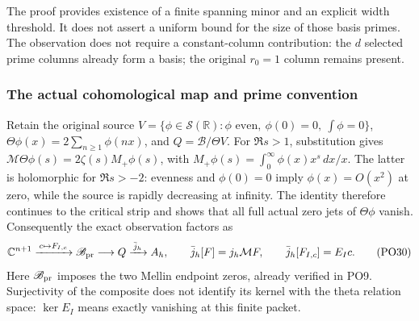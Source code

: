 \documentclass[11pt,a4paper]{article}
\theoremstyle{definition}\newtheorem{definition}[theorem]{Definition}
\newcommand{\C}{\mathbb C}\newcommand{\R}{\mathbb R}
\begin{document}
The proof provides existence of a finite spanning minor and an
explicit width threshold. It does not assert a uniform bound for
the size of those basis primes. The observation does not require
a constant-column contribution: the \(d\) selected prime columns
already form a basis; the original \(r_0=1\) column remains present.

\subsubsection{The actual cohomological map and prime convention}

Retain the original source
\(V=\{\phi\in\mathcal S(\R):\phi\text{ even},
\ \phi(0)=0,\ \int\phi=0\}\),
\(\Theta\phi(x)=2\sum_{n\ge1}\phi(nx)\), and \(Q=\mathscr B/\Theta V\).
For \(\Re s>1\), substitution gives
\(\mathcal M\Theta\phi(s)=2\zeta(s)M_+\phi(s)\), with
\(M_+\phi(s)=\int_0^\infty\phi(x)x^s\,dx/x\).
The latter is holomorphic for \(\Re s>-2\):
evenness and \(\phi(0)=0\) imply \(\phi(x)=O(x^2)\) at zero,
while the source is rapidly decreasing at infinity.
The identity therefore continues to the critical strip and
shows that all full actual zero jets of \(\Theta\phi\) vanish.
Consequently the exact observation factors as
\[
 \C^{n+1}\xrightarrow{\,c\mapsto F_{I,c}\,}
 \mathscr B_{\rm pr}\longrightarrow Q
       \xrightarrow{\,\bar j_h\,}A_h,\qquad
 \bar j_h[F]=j_h\mathcal M F,\qquad
 \bar j_h[F_{I,c}]=E_Ic .
 \tag{PO30}\label{PO:po:Qmap}
\]
Here \(\mathscr B_{\rm pr}\) imposes the two Mellin endpoint zeros,
already verified in PO9. Surjectivity of the composite does
not identify its kernel with the theta relation space:
\(\ker E_I\) means exactly vanishing at this finite packet.
\end{document}
